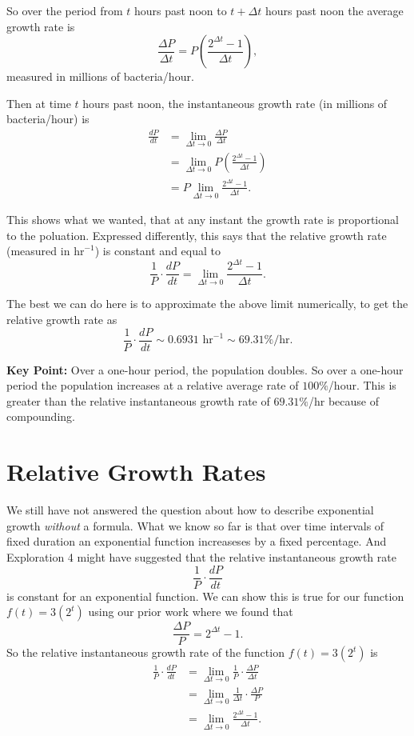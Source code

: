 \documentclass{ximera}
\begin{document}
So over the period from $t$ hours past noon to $t+\Delta t$ hours past noon the average growth rate is 
\[
    \frac{\Delta P}{\Delta t} = P \left( \frac{2^{\Delta t} - 1}{\Delta t}  \right) ,
\]
measured in millions of bacteria/hour.

Then at time $t$ hours past noon, the instantaneous growth rate (in millions of bacteria/hour) is
\begin{align*}
 \frac{dP}{dt} &= \lim_{\Delta t\to 0} \frac{\Delta P}{\Delta t} \\
                     &=  \lim_{\Delta t\to 0} P \left( \frac{2^{\Delta t} - 1}{\Delta t}  \right) \\
                     &= P \lim_{\Delta t\to 0}\frac{2^{\Delta t} - 1}{\Delta t} .
\end{align*}

 This shows what we wanted, that at any instant the growth rate is proportional to the poluation. Expressed differently, this says that the relative growth rate (measured in $\text{hr}^{-1}$) is constant and equal to
\[
        \frac{1}{P} \cdot \frac{dP}{dt} = \lim_{\Delta t\to 0}\frac{2^{\Delta t} - 1}{\Delta t} .
\]

The best we can do here is to approximate the above limit numerically, to get the relative growth rate as
\[
  \frac{1}{P} \cdot \frac{dP}{dt} \sim 0.6931 \text{ hr}^{-1} \sim 69.31\%/\text{hr}.
\]

{\bf Key Point:} Over a one-hour period, the population doubles. So over a one-hour period the population increases at a relative average rate of $100\%$/hour. This is greater than the relative instantaneous growth rate of $69.31\%$/hr because of compounding.

\section{Relative Growth Rates}
We still have not answered the question about how to describe exponential growth \emph{without} a formula. What we know so far is that over time intervals of fixed duration an exponential function increaseses by a fixed percentage.  And Exploration 4 might have suggested that the relative instantaneous growth rate 
\[
  \frac{1}{P}\cdot \frac{dP}{dt}
\]
is constant for an exponential function. We can show this is true for our function $f(t)=3(2^t)$ using our prior work where we found that 
\[
  \frac{\Delta P}{P} = 2^{\Delta t} - 1 .
\]
So the relative instantaneous growth rate of the function $f(t)=3(2^t)$ is 
\begin{align*}
      \frac{1}{P}\cdot \frac{dP}{dt} &= \lim_{\Delta t\to  0} \frac{1}{P} \cdot \frac{\Delta P}{\Delta t} \\
                                                   &= \lim_{\Delta t\to  0} \frac{1}{\Delta t} \cdot \frac{\Delta P}{P} \\
                                                   &=  \lim_{\Delta t\to  0}  \frac{2^{\Delta t} - 1}{\Delta t} .
\end{align*}
\end{document}
